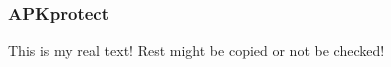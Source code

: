 \subsubsection{APKprotect} \label{subsubsection:counter-reengineering-propack-apkprotect}
This is my real text! Rest might be copied or not be checked!
